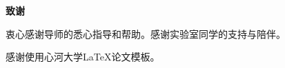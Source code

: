 

\begin{center}
    {\sanhao\sffamily\bfseries 致\quad 谢}
\end{center}

\vspace{0.5cm}

衷心感谢导师的悉心指导和帮助。感谢实验室同学的支持与陪伴。

感谢使用心河大学LaTeX论文模板。
